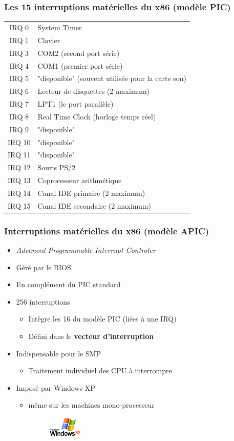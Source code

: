 \begin{frame}
 \frametitle{Les 15 interruptions matérielles du x86 (modèle PIC)}
 \begin{small}
 \begin{tabular}{c|l}
  IRQ 0 & System Timer \\
  IRQ 1 & Clavier \\
  IRQ 3 & COM2 (second port série) \\
  IRQ 4 & COM1 (premier port série) \\
  IRQ 5 &  "disponible" (souvent utilisée pour la carte son) \\
  IRQ 6 & Lecteur de disquettes (2 maximum) \\
  IRQ 7 & LPT1 (le port parallèle) \\
  IRQ 8 & Real Time Clock (horloge temps réel) \\
  IRQ 9 &  "disponible" \\
  IRQ 10 & "disponible" \\
  IRQ 11 & "disponible" \\
  IRQ 12 & Souris PS/2 \\
  IRQ 13 & Coprocesseur arithmétique \\
  IRQ 14 & Canal IDE primaire (2 maximum) \\
  IRQ 15 & Canal IDE secondaire (2 maximum)
 \end{tabular}
\end{small}
\end{frame}

\begin{frame}
\frametitle{Interruptions matérielles du x86 (modèle APIC)}
\begin{itemize}
\item \textit{Advanced Programmable Interrupt Controler}
\item Géré par le BIOS
\item En complément du PIC standard
\item 256 interruptions
\begin{itemize}
\item Intègre les 16 du modèle PIC (liées à une IRQ)
\item Défini dans le \textbf{vecteur d'interruption}
\end{itemize}
\item Indispensable pour le SMP
\begin{itemize}
\item Traitement individuel des CPU à interrompre
\end{itemize}
\item Imposé par Windows XP
\begin{itemize}
\item même sur les machines mono-processeur
\begin{figure}[b!]
\includegraphics[height=1cm]{../illustration/logo_windowsXP.png}
\end{figure}
\end{itemize}
\end{itemize}
\end{frame}

